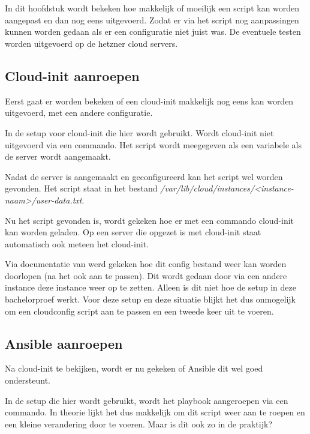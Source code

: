 \chapter{}
\label{ch:naopstarten}
In dit hoofdstuk wordt bekeken hoe makkelijk of moeilijk een script kan worden aangepast en dan nog eens uitgevoerd. Zodat er via het script nog aanpassingen kunnen worden gedaan als er een configuratie niet juist was. De eventuele testen worden uitgevoerd op de hetzner cloud servers.

\section{Cloud-init aanroepen}
Eerst gaat er worden bekeken of een cloud-init makkelijk nog eens kan worden uitgevoerd, met een andere configuratie. 

In de setup voor cloud-init die hier wordt gebruikt. Wordt cloud-init niet uitgevoerd via een commando. Het script wordt meegegeven als een variabele als de server wordt aangemaakt. 

Nadat de server is aangemaakt en geconfigureerd kan het script wel worden gevonden. Het script staat in het bestand \textit{/var/lib/cloud/instances/<instance-naam>/user-data.txt}.

Nu het script gevonden is, wordt gekeken hoe er met een commando cloud-init kan worden geladen. Op een server die opgezet is met cloud-init staat automatisch ook meteen het cloud-init.

Via documentatie van \autocite{scaleaway} werd gekeken hoe dit config bestand weer kan worden doorlopen (na het ook aan te passen). Dit wordt gedaan door via een andere instance deze instance weer op te zetten. Alleen is dit niet hoe de setup in deze bachelorproef werkt. Voor deze setup en deze situatie blijkt het dus onmogelijk om een cloudconfig script aan te passen en een tweede keer uit te voeren.



\section{Ansible aanroepen}
Na cloud-init te bekijken, wordt er nu gekeken of Ansible dit wel goed ondersteunt. 

In de setup die hier wordt gebruikt, wordt het playbook aangeroepen via een commando. In theorie lijkt het dus makkelijk om dit script weer aan te roepen en een kleine verandering door te voeren. Maar is dit ook zo in de praktijk?

